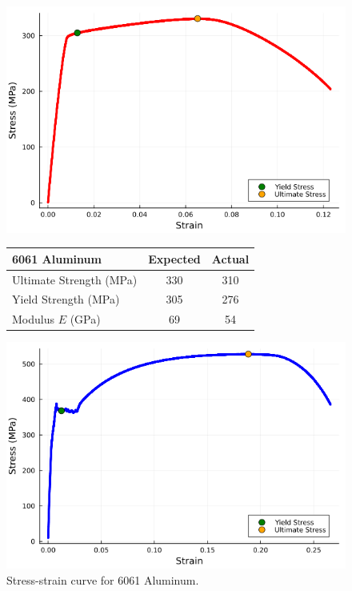 \documentclass[conf]{new-aiaa} %
\begin{document}
\begin{figure}[h!]
\centering

\begin{minipage}{0.48\textwidth}
    \centering
    \includegraphics[width=\linewidth]{aluminum_plot.png}
    \caption{Stress-strain curve for 6061 Aluminum.}
    \label{fig:aluminum}
    \vspace{2em}
    \renewcommand{\arraystretch}{1.3}
    \begin{tabular}{lcc}
    \toprule
    \textbf{6061 Aluminum} & Expected & Actual \\
    \midrule
    Ultimate Strength (MPa) & 330 & 310 \\ 
    Yield Strength (MPa)    & 305 & 276 \\ 
    Modulus $E$ (GPa)       & 69  & 54 \\ 
    \bottomrule
    \end{tabular}
    \label{tab:aluminum}
\end{minipage}
\hfill
\begin{minipage}{0.48\textwidth}
    \centering
    \includegraphics[width=\linewidth]{steel_plot.png}

\end{minipage}
\end{figure}
\end{document}
